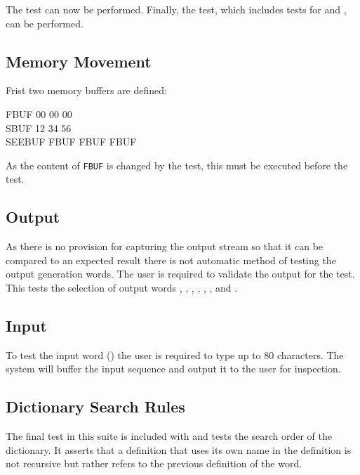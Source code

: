 The  test can now be performed.
Finally, the  test, which includes tests for
 and , can be performed.

\subsection{Memory Movement}

Frist two memory buffers are defined:

\begin{tt}
 FBUF 00  00  00  \\
 SBUF 12  34  56  \\
\word{:} SEEBUF FBUF   FBUF    FBUF    \word{;}
\end{tt}

As the content of \texttt{FBUF} is changed by the
 test, this must be executed before the
\linebreak {} test.

\subsection{Output}

As there is no provision for capturing the output stream so that it
can be compared to an expected result there is not automatic method
of testing the output generation words.  The user is required to
validate the output for the  test.  This tests
the selection of output words , , ,
, , , and .

\subsection{Input}

To test the input word () the user is
required to type up to 80 characters.  The system will buffer the
input sequence and output it to the user for inspection.

\subsection{Dictionary Search Rules}

The final test in this suite is included with  and
tests the search order of the dictionary.  It asserts that a
definition that uses its own name in the definition is not recursive
but rather refers to the previous definition of the word.

